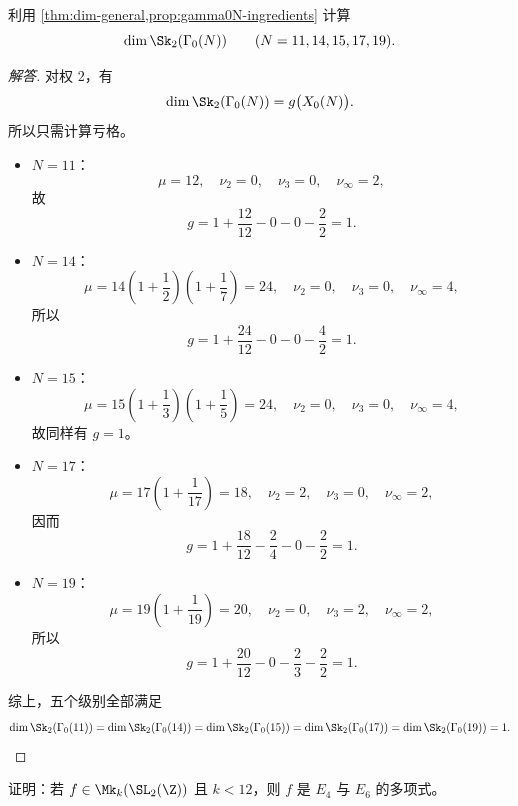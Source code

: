 \begin{exercise}
\label{ex:weight2-gamma0N}
利用 \cref{thm:dim-general,prop:gamma0N-ingredients} 计算
\[
  \dim \Sk_2(\Gamma_0(N))
  \qquad (N=11,14,15,17,19).
\]
\end{exercise}

\begin{proof}[解答]
对权 $2$，有
\[
  \dim \Sk_2(\Gamma_0(N))=g\bigl(X_0(N)\bigr).
\]
所以只需计算亏格。

\begin{itemize}
  \item $N=11$：
        \[
          \mu=12,\quad \nu_2=0,\quad \nu_3=0,\quad \nu_\infty=2,
        \]
        故
        \[
          g=1+\frac{12}{12}-0-0-\frac22=1.
        \]

  \item $N=14$：
        \[
          \mu=14\left(1+\frac12\right)\left(1+\frac17\right)=24,
          \quad \nu_2=0,
          \quad \nu_3=0,
          \quad \nu_\infty=4,
        \]
        所以
        \[
          g=1+\frac{24}{12}-0-0-\frac42=1.
        \]

  \item $N=15$：
        \[
          \mu=15\left(1+\frac13\right)\left(1+\frac15\right)=24,
          \quad \nu_2=0,
          \quad \nu_3=0,
          \quad \nu_\infty=4,
        \]
        故同样有 $g=1$。

  \item $N=17$：
        \[
          \mu=17\left(1+\frac1{17}\right)=18,
          \quad \nu_2=2,
          \quad \nu_3=0,
          \quad \nu_\infty=2,
        \]
        因而
        \[
          g=1+\frac{18}{12}-\frac24-0-\frac22=1.
        \]

  \item $N=19$：
        \[
          \mu=19\left(1+\frac1{19}\right)=20,
          \quad \nu_2=0,
          \quad \nu_3=2,
          \quad \nu_\infty=2,
        \]
        所以
        \[
          g=1+\frac{20}{12}-0-\frac23-\frac22=1.
        \]
\end{itemize}

综上，五个级别全部满足
\[
  \dim \Sk_2(\Gamma_0(11))=
  \dim \Sk_2(\Gamma_0(14))=
  \dim \Sk_2(\Gamma_0(15))=
  \dim \Sk_2(\Gamma_0(17))=
  \dim \Sk_2(\Gamma_0(19))=1.
\]
\end{proof}

\begin{exercise}
\label{ex:small-weight-polynomial}
证明：若 $f\in \Mk_k(\SL_2(\Z))$ 且 $k<12$，则 $f$ 是 $E_4$ 与 $E_6$ 的多项式。
\end{exercise}

